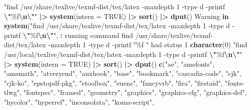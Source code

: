 \documentclass[
]{article}
\newenvironment{Shaded}{\begin{snugshade}}{\end{snugshade}}
\newcommand{\AttributeTok}[1]{\textcolor[rgb]{0.13,0.29,0.53}{#1}}
\newcommand{\ConstantTok}[1]{\textcolor[rgb]{0.56,0.35,0.01}{#1}}
\newcommand{\ControlFlowTok}[1]{\textcolor[rgb]{0.13,0.29,0.53}{\textbf{#1}}}
\newcommand{\DecValTok}[1]{\textcolor[rgb]{0.00,0.00,0.81}{#1}}
\newcommand{\FunctionTok}[1]{\textcolor[rgb]{0.13,0.29,0.53}{\textbf{#1}}}
\newcommand{\NormalTok}[1]{#1}
\newcommand{\SpecialCharTok}[1]{\textcolor[rgb]{0.81,0.36,0.00}{\textbf{#1}}}
\newcommand{\StringTok}[1]{\textcolor[rgb]{0.31,0.60,0.02}{#1}}
\begin{document}
\begin{Shaded}
\begin{Highlighting}[]
\StringTok{"find /usr/share/texlive/texmf{-}dist/tex/latex {-}maxdepth 1 {-}type d {-}printf }\SpecialCharTok{\textbackslash{}"}\StringTok{\%f}\SpecialCharTok{\textbackslash{}n\textbackslash{}"}\StringTok{"} \SpecialCharTok{|\textgreater{}}
    \FunctionTok{system}\NormalTok{(}\AttributeTok{intern =} \ConstantTok{TRUE}\NormalTok{) }\SpecialCharTok{|\textgreater{}}
    \FunctionTok{sort}\NormalTok{() }\SpecialCharTok{|\textgreater{}}
    \FunctionTok{dput}\NormalTok{()}
\NormalTok{Warning }\ControlFlowTok{in} \FunctionTok{system}\NormalTok{(}\StringTok{"find /usr/share/texlive/texmf{-}dist/tex/latex {-}maxdepth 1 {-}type d {-}printf }\SpecialCharTok{\textbackslash{}"}\StringTok{\%f}\SpecialCharTok{\textbackslash{}n\textbackslash{}"}\StringTok{"}\NormalTok{, }\SpecialCharTok{:}\NormalTok{ running command }\StringTok{\textquotesingle{}find /usr/share/texlive/texmf{-}dist/tex/latex {-}maxdepth 1 {-}type d {-}printf "\%f}
\StringTok{"\textquotesingle{}}\NormalTok{ had status }\DecValTok{1}
\FunctionTok{character}\NormalTok{(}\DecValTok{0}\NormalTok{)}
\StringTok{"find /usr/local/texlive/texmf{-}dist/tex/latex {-}maxdepth 1 {-}type d {-}printf }\SpecialCharTok{\textbackslash{}"}\StringTok{\%f}\SpecialCharTok{\textbackslash{}n\textbackslash{}"}\StringTok{"} \SpecialCharTok{|\textgreater{}}
    \FunctionTok{system}\NormalTok{(}\AttributeTok{intern =} \ConstantTok{TRUE}\NormalTok{) }\SpecialCharTok{|\textgreater{}}
    \FunctionTok{sort}\NormalTok{() }\SpecialCharTok{|\textgreater{}}
    \FunctionTok{dput}\NormalTok{()}
\FunctionTok{c}\NormalTok{(}\StringTok{"ae"}\NormalTok{, }\StringTok{"amsfonts"}\NormalTok{, }\StringTok{"amsmath"}\NormalTok{, }\StringTok{"atveryend"}\NormalTok{, }\StringTok{"auxhook"}\NormalTok{, }\StringTok{"base"}\NormalTok{, }
\StringTok{"bookmark"}\NormalTok{, }\StringTok{"cascadia{-}code"}\NormalTok{, }\StringTok{"cjk"}\NormalTok{, }\StringTok{"cjk{-}ko"}\NormalTok{, }\StringTok{"epstopdf{-}pkg"}\NormalTok{, }
\StringTok{"etoolbox"}\NormalTok{, }\StringTok{"euenc"}\NormalTok{, }\StringTok{"fancyvrb"}\NormalTok{, }\StringTok{"fira"}\NormalTok{, }\StringTok{"firstaid"}\NormalTok{, }\StringTok{"fonts{-}tlwg"}\NormalTok{, }
\StringTok{"fontspec"}\NormalTok{, }\StringTok{"framed"}\NormalTok{, }\StringTok{"geometry"}\NormalTok{, }\StringTok{"graphics"}\NormalTok{, }\StringTok{"graphics{-}cfg"}\NormalTok{, }
\StringTok{"graphics{-}def"}\NormalTok{, }\StringTok{"hycolor"}\NormalTok{, }\StringTok{"hyperref"}\NormalTok{, }\StringTok{"inconsolata"}\NormalTok{, }\StringTok{"koma{-}script"}\NormalTok{, }

\end{Highlighting}
\end{Shaded}
\end{document}
